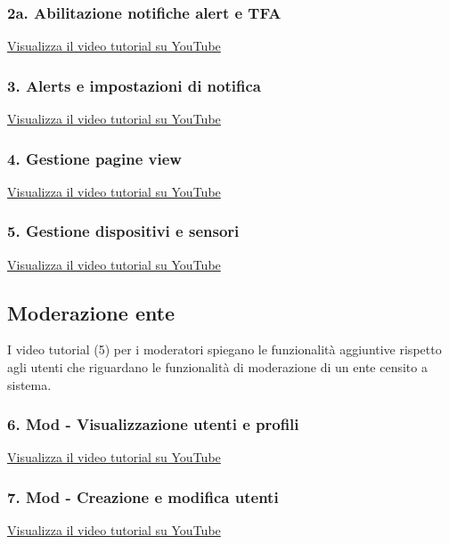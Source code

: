 \subsubsection{2a. Abilitazione notifiche alert e TFA}
\href{https://www.youtube.com/watch?v=PjySMOLCtMA&list=PLPKYjnuIh1FA3b3jn_bwY_ztYzaFn2mIT&index=5}
{Visualizza il video tutorial su YouTube}

\subsubsection{3. Alerts e impostazioni di notifica}
\href{https://www.youtube.com/watch?v=PjySMOLCtMA&list=PLPKYjnuIh1FA3b3jn_bwY_ztYzaFn2mIT&index=6}
{Visualizza il video tutorial su YouTube}

\subsubsection{4. Gestione pagine view}
\href{https://www.youtube.com/watch?v=PjySMOLCtMA&list=PLPKYjnuIh1FA3b3jn_bwY_ztYzaFn2mIT&index=7}
{Visualizza il video tutorial su YouTube}

\subsubsection{5. Gestione dispositivi e sensori}
\href{https://www.youtube.com/watch?v=PjySMOLCtMA&list=PLPKYjnuIh1FA3b3jn_bwY_ztYzaFn2mIT&index=8}
{Visualizza il video tutorial su YouTube}

\subsection{Moderazione ente}

I video tutorial (5) per i moderatori spiegano le funzionalità aggiuntive rispetto agli utenti che riguardano le funzionalità di moderazione di un ente censito a sistema.

\subsubsection{6. Mod - Visualizzazione utenti e profili}
\href{https://www.youtube.com/watch?v=PjySMOLCtMA&list=PLPKYjnuIh1FA3b3jn_bwY_ztYzaFn2mIT&index=9}
{Visualizza il video tutorial su YouTube}

\subsubsection{7. Mod - Creazione e modifica utenti}
\href{https://www.youtube.com/watch?v=PjySMOLCtMA&list=PLPKYjnuIh1FA3b3jn_bwY_ztYzaFn2mIT&index=10}
{Visualizza il video tutorial su YouTube}


